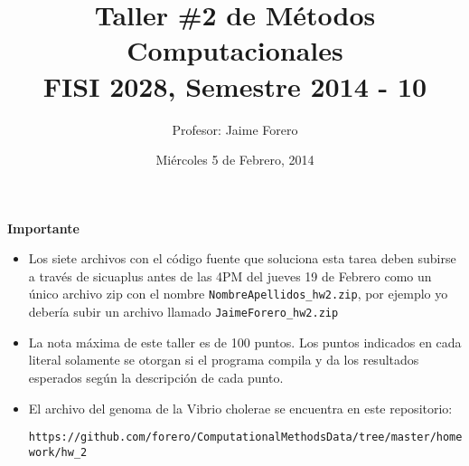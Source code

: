\documentclass{article}
\title{Taller \#2 de M\'etodos Computacionales\\ FISI 2028, Semestre 2014 - 10}
\author{Profesor: Jaime Forero}
\date{Mi\'ercoles 5 de Febrero, 2014}
\begin{document}
\maketitle
\thispagestyle{empty}


{\bf Importante}
\begin{itemize}

\item Los siete archivos con el c\'odigo fuente que soluciona esta
  tarea deben subirse a trav\'es de sicuaplus antes de las 4PM del
  jueves 19 de Febrero como un \'unico archivo zip con el nombre
  \verb"NombreApellidos_hw2.zip", por ejemplo yo deber\'ia subir un
  archivo llamado \verb"JaimeForero_hw2.zip"

\item La nota m\'axima de este taller es de 100 puntos. Los puntos indicados
en cada literal solamente se otorgan si el programa compila y da los
resultados esperados seg\'un la descripci\'on de cada punto.
 

\item El archivo del genoma de la Vibrio cholerae se encuentra en este
  repositorio:

  \verb"https://github.com/forero/ComputationalMethodsData/tree/master/homework/hw_2"
\end{itemize}
\end{document}
